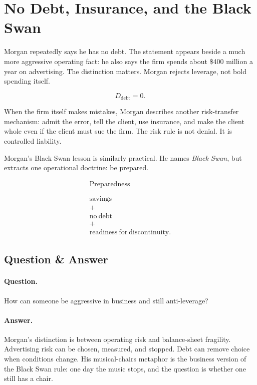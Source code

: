 \documentclass[11pt,oneside]{book}
\begin{document}
\section{No Debt, Insurance, and the Black Swan}

Morgan repeatedly says he has no debt. The statement appears beside a much more aggressive operating fact: he also says the firm spends about \$400 million a year on advertising. The distinction matters. Morgan rejects leverage, not bold spending itself.

\begin{equation}
D_{\mathrm{debt}}=0.
\end{equation}

When the firm itself makes mistakes, Morgan describes another risk-transfer mechanism: admit the error, tell the client, use insurance, and make the client whole even if the client must sue the firm. The risk rule is not denial. It is controlled liability.

Morgan's Black Swan lesson is similarly practical. He names \emph{Black Swan}, but extracts one operational doctrine: be prepared.

\begin{equation}
\begin{gathered}
\mathrm{Preparedness}\\
=\\
\mathrm{savings}\\
+\\
\mathrm{no\ debt}\\
+\\
\mathrm{readiness\ for\ discontinuity}.
\end{gathered}
\end{equation}

\subsection{Question \& Answer}

\paragraph{Question.}
How can someone be aggressive in business and still anti-leverage?

\paragraph{Answer.}
Morgan's distinction is between operating risk and balance-sheet fragility. Advertising risk can be chosen, measured, and stopped. Debt can remove choice when conditions change. His musical-chairs metaphor is the business version of the Black Swan rule: one day the music stops, and the question is whether one still has a chair.
\end{document}
